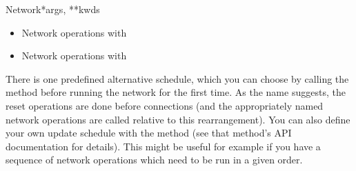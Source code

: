 \documentclass[letterpaper,10pt,english]{manual}
\begin{document}
\begin{classdesc}{Network}{*args, **kwds}
\begin{itemize}
\item {} 
Network operations with 

\item {} 
Network operations with 

\end{itemize}

There is one predefined alternative schedule, which you can choose by calling
the  method before running the
network for the first time. As the name suggests, the reset operations are
done before connections (and the appropriately named network operations are
called relative to this rearrangement). You can also define your own update
schedule with the  method (see that method's API documentation for
details). This might be useful for example if you have a sequence of network
operations which need to be run in a given order.
\end{classdesc}
\end{document}
